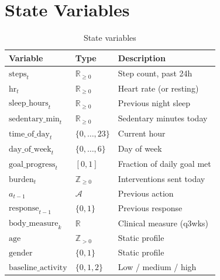 \documentclass[11pt,a4paper]{article}
\begin{document}



\appendix
\section{State Variables}
\label{app:state}

\begin{table}[H]
\centering
\caption{State variables}
\begin{tabular}{lll}
\toprule
Variable & Type & Description \\
\midrule
$\text{steps}_t$ & $\mathbb{R}_{\geq 0}$ & Step count, past 24h \\
$\text{hr}_t$ & $\mathbb{R}_{\geq 0}$ & Heart rate (or resting) \\
$\text{sleep\_hours}_t$ & $\mathbb{R}_{\geq 0}$ & Previous night sleep \\
$\text{sedentary\_min}_t$ & $\mathbb{R}_{\geq 0}$ & Sedentary minutes today \\
$\text{time\_of\_day}_t$ & $\{0,\dots,23\}$ & Current hour \\
$\text{day\_of\_week}_t$ & $\{0,\dots,6\}$ & Day of week \\
$\text{goal\_progress}_t$ & $[0,1]$ & Fraction of daily goal met \\
$\text{burden}_t$ & $\mathbb{Z}_{\geq 0}$ & Interventions sent today \\
$a_{t-1}$ & $\mathcal{A}$ & Previous action \\
$\text{response}_{t-1}$ & $\{0,1\}$ & Previous response \\
$\text{body\_measure}_k$ & $\mathbb{R}$ & Clinical measure (q3wks) \\
$\text{age}$ & $\mathbb{Z}_{>0}$ & Static profile \\
$\text{gender}$ & $\{0,1\}$ & Static profile \\
$\text{baseline\_activity}$ & $\{0,1,2\}$ & Low / medium / high \\
\bottomrule
\end{tabular}
\end{table}
\end{document}
